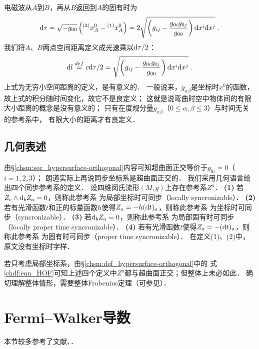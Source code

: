 电磁波从$A$到$B$，再从$B$返回到$A$的固有时为
\begin{equation}
    {\rm d}\tau = \sqrt{-g_{00} }\left( {}^{(2)}x_A^0 - {}^{(1)}x_A^0 \right)
    =2 \sqrt{\left(g_{ij}- \frac{g_{0i}g_{0j}}{g_{00}}\right){\rm d}x^i {\rm d}x^j} \ .
\end{equation}
我们将$A$、$B$两点{\heiti 空间距离}定义成光速乘以${\rm d}\tau/2$：
\begin{equation}
    {\rm d}l \overset{def}{=}c {\rm d}\tau /2
    = \sqrt{\left(g_{ij}- \frac{g_{0i}g_{0j}}{g_{00}}\right){\rm d}x^i {\rm d}x^j} \ .
\end{equation}
上式为无穷小空间距离的定义，是有意义的．
一般说来，$g_{\alpha\beta}$是坐标时$x^0$的函数，故上式的积分随时间变化，故它不是良定义；
这就是说弯曲时空中物体间的有限大小距离的概念是没有意义的；
只有在度规分量$g_{\alpha\beta}$（$0\leqslant \alpha,\beta\leqslant 3$）与时间无关的参考系中，
有限大小的距离才有良定义．





\subsection{几何表述}
由\S\ref{chsm:sec_hypersurface-orthogonal}内容可知超曲面正交等价于$g_{0i}=0$（$i=1,2,3$）；
朗道实际上再说同步坐标系是超曲面正交的．
我们采用几何语言\cite[\S 2.3]{sachs-wu-1977}给出四个同步参考系的定义．
设四维闵氏流形$(M,g)$上存在参考系$Z^a$．
{\bfseries (1) }若$Z_c\wedge {\rm d}_bZ_a=0$，则称此参考系
为{\heiti 局部坐标时可同步}（locally syncronizable）．
{\bfseries (2) }若有光滑函数$t$和正的标量函数$h$使得$Z_a=-h({\rm d}t)_a$，则称此参考系
为{\heiti 坐标时可同步}（syncronizable）．
{\bfseries (3) }若${\rm d}_bZ_a=0$，则称此参考系
为{\heiti 局部固有时可同步}（locally proper time syncronizable）．
{\bfseries (4) }若有光滑函数$t$使得$Z_a=-({\rm d}t)_a$，则称此参考系
为{\heiti 固有时可同步}（proper time syncronizable）．
在定义(1)、(2)中，原文没有{\kaishu 坐标时}字样．



若只考虑局部坐标系，由\S\ref{chsm:def_hypersurface-orthogonal}中的
式\eqref{chdf:eqn_HOF}可知上述四个定义中$Z^a$都与超曲面正交；但整体上未必如此．
确切理解整体情形，需要整体Frobenius定理（可参见\parencite[\S 6.6-6.7]{spivak-dif-1}）．






\section{Fermi--Walker导数}
本节较多参考了文献\parencite[\S 4.1]{hawking-ellis1973}、\parencite[\S 6.5]{mtw1973}．

